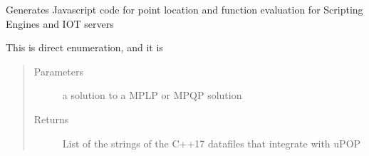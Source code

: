 \documentclass[letterpaper,10pt,english]{sphinxmanual}
\begin{document}

\begin{fulllineitems}
\label{\detokenize{ppopt.upop:ppopt.upop.linear_code_gen.generate_code_js}}
\sphinxAtStartPar
Generates Javascript code for point location and function evaluation for Scripting Engines and IOT servers

\sphinxAtStartPar
This is direct enumeration, and it is
\begin{quote}\begin{description}
\item[{Parameters}] \leavevmode
\sphinxAtStartPar
{} \textendash{} a solution to a MPLP or MPQP solution

\item[{Returns}] \leavevmode
\sphinxAtStartPar
List of the strings of the C++17 datafiles that integrate with uPOP

\end{description}\end{quote}

\end{fulllineitems}

\end{document}
